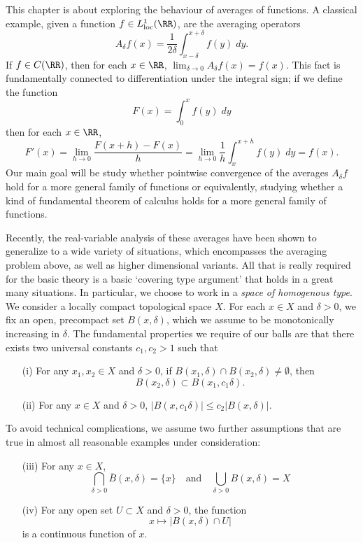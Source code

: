 This chapter is about exploring the behaviour of averages of functions. A classical example, given a function $f \in L^1_{\text{loc}}(\RR)$, are the averaging operators
%
\[ A_\delta f(x) = \frac{1}{2\delta} \int_{x-\delta}^{x+\delta} f(y)\; dy. \]
%
If $f \in C(\RR)$, then for each $x \in \RR$, $\lim_{\delta \to 0} A_\delta f(x) = f(x)$. This fact is fundamentally connected to differentiation under the integral sign; if we define the function
%
\[ F(x) = \int_0^x f(y)\; dy \]
%
then for each $x \in \RR$,
%
\[ F'(x) = \lim_{h \to 0} \frac{F(x+h) - F(x)}{h} = \lim_{h \to 0} \frac{1}{h} \int_x^{x+h} f(y)\; dy = f(x). \]
%
Our main goal will be study whether pointwise convergence of the averages $A_\delta f$ hold for a more general family of functions or equivalently, studying whether a kind of fundamental theorem of calculus holds for a more general family of functions.

Recently, the real-variable analysis of these averages have been shown to generalize to a wide variety of situations, which encompasses the averaging problem above, as well as higher dimensional variants. All that is really required for the basic theory is a basic `covering type argument' that holds in a great many situations. In particular, we choose to work in a \emph{space of homogenous type}. We consider a locally compact topological space $X$. For each $x \in X$ and $\delta > 0$, we fix an open, precompact set $B(x,\delta)$, which we assume to be monotonically increasing in $\delta$. The fundamental properties we require of our balls are that there exists two universal constants $c_1,c_2 > 1$ such that
%
\begin{enumerate}
  \item[(i)] For any $x_1,x_2 \in X$ and $\delta > 0$, if $B(x_1,\delta) \cap B(x_2,\delta) \neq \emptyset$, then
  \[ B(x_2,\delta) \subset B(x_1,c_1 \delta). \]

  \item[(ii)] For any $x \in X$ and $\delta > 0$, $|B(x,c_1\delta)| \leq c_2 |B(x,\delta)|$.
\end{enumerate}
%
To avoid technical complications, we assume two further assumptions that are true in almost all reasonable examples under consideration:
%
\begin{enumerate}
  \item[(iii)] For any $x \in X$,
  \[ \bigcap_{\delta > 0} \overline{B}(x,\delta) = \{ x \} \quad\text{and}\quad \bigcup_{\delta > 0} B(x,\delta) = X \]

  \item[(iv)] For any open set $U \subset X$ and $\delta > 0$, the function
  \[ x \mapsto |B(x,\delta) \cap U| \]
  is a continuous function of $x$.
\end{enumerate}

